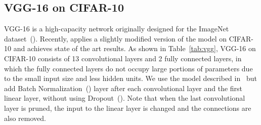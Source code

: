 \documentclass{article} \usepackage{iclr2017_conference,times}
\begin{document}
\subsection{VGG-16 on CIFAR-10}
VGG-16 is a high-capacity network originally designed for the ImageNet dataset~(\cite{vgg}).
Recently, \cite{torch_cifar10} applies a slightly modified version of the model on CIFAR-10 and achieves state of the art results.
As shown in Table~\ref{tab:vgg}, VGG-16 on CIFAR-10 consists of 13 convolutional layers and 2 fully connected layers, in which the fully connected layers do not occupy large portions of parameters due to the small input size and less hidden units.
We use the model described in~\cite{torch_cifar10} but add Batch Normalization~(\cite{batchnorm}) layer after each convolutional layer and the first linear layer, without using Dropout~(\cite{dropout}).
Note that when the last convolutional layer is pruned, the input to the linear layer is changed and the connections are also removed.
\end{document}
